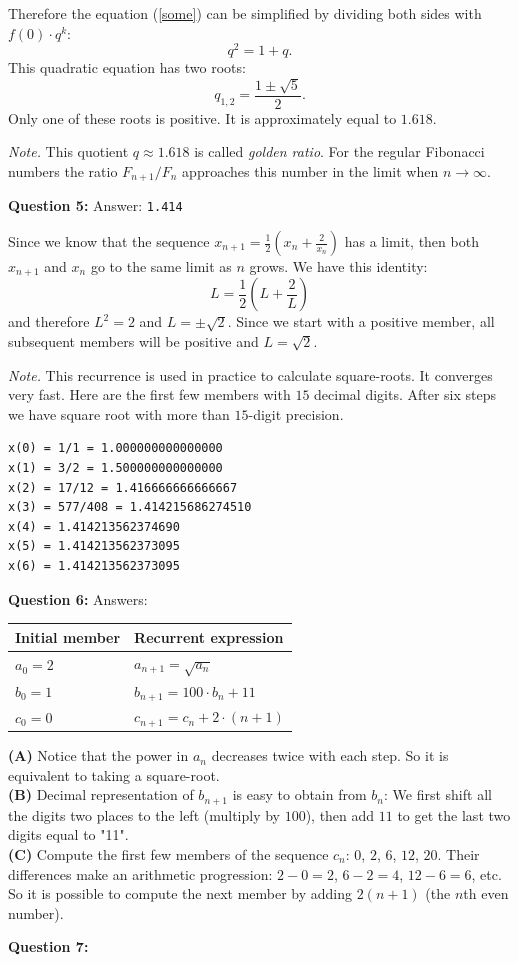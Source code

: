 \documentclass[jou]{apa6}
\begin{document}
Therefore the equation (\ref{some}) can be simplified by dividing both sides
with $f(0) \cdot q^k$:
$$q^2 = 1 + q.$$
This quadratic equation has two roots: 
$$q_{1,2} = \frac{1 \pm \sqrt{5}}{2}.$$
Only one of these roots is positive. It is approximately equal to $1.618$. 

{\em Note.} This quotient $q \approx 1.618$ is called {\em golden ratio}. 
For the regular Fibonacci numbers the ratio $F_{n+1}/F_{n}$ approaches 
this number in the limit when $n \rightarrow \infty$.


\vspace{6pt}
{\bf Question 5:} Answer: {\tt 1.414}

Since we know that the sequence 
$x_{n+1} = \frac{1}{2} \left( x_n + \frac{2}{x_n}\right)$ has a limit, then 
both $x_{n+1}$ and $x_n$ go to the same limit as $n$ grows. We have this identity:
$$L = \frac{1}{2} \left (L + \frac{2}{L} \right)$$
and therefore $L^2 =2$ and $L = \pm \sqrt{2}$. Since we start with a positive member, 
all subsequent members will be positive and $L = \sqrt{2}$.

{\em Note.} This recurrence is used in practice to calculate 
square-roots. It converges very fast. Here are the first few members with $15$ decimal digits. 
After six steps we have square root with more than $15$-digit precision.
\begin{verbatim}
x(0) = 1/1 = 1.000000000000000
x(1) = 3/2 = 1.500000000000000
x(2) = 17/12 = 1.416666666666667
x(3) = 577/408 = 1.414215686274510
x(4) = 1.414213562374690
x(5) = 1.414213562373095
x(6) = 1.414213562373095
\end{verbatim}



\vspace{6pt}
{\bf Question 6:} Answers:\\
\begin{tabular}{|l|l|} \hline
{\bf Initial member} & {\bf Recurrent expression} \\ \hline
$a_0 = 2$ & $a_{n+1} = \sqrt{a_n}$ \\ \hline
$b_0 = 1$ & $b_{n+1} = 100\cdot b_n + 11$ \\ \hline 
$c_0 = 0$ & $c_{n+1} = c_n + 2\cdot(n+1)$ \\ \hline 
\end{tabular}

{\bf (A)} Notice that the power in $a_n$ decreases twice with each step. 
So it is equivalent to taking a square-root.\\
{\bf (B)} Decimal representation of $b_{n+1}$ is easy to obtain from $b_n$: 
We first shift all the digits two places to the left (multiply by $100$), then 
add $11$ to get the last two digits equal to "11".\\
{\bf (C)} Compute the first few members of the sequence $c_n$: 
$0$, $2$, $6$, $12$, $20$. Their differences make an arithmetic progression: 
$2-0 = 2$, $6-2 = 4$, $12-6=6$, etc. So it is possible to compute the next
member by adding $2(n+1)$ (the $n$th even number).



\vspace{6pt}
{\bf Question 7:}

 
\end{document}

